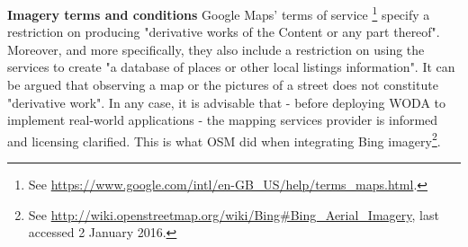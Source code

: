 \textbf{Imagery terms and conditions} Google Maps' terms of service \footnote{See \url{https://www.google.com/intl/en-GB_US/help/terms_maps.html}.} specify a restriction on producing "derivative works of the Content or any part thereof". Moreover, and more specifically, they also include a restriction on using the services to create "a database of places or other local listings information". It can be argued that observing a map or the pictures of a street does not constitute "derivative work". In any case, it is advisable that - before deploying WODA to implement real-world applications - the mapping services provider is informed and licensing clarified. This is what OSM did when integrating Bing imagery\footnote{See \url{http://wiki.openstreetmap.org/wiki/Bing#Bing_Aerial_Imagery}, last accessed 2 January 2016.}.

